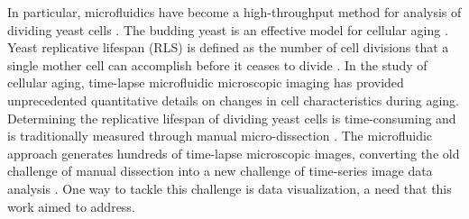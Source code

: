 \documentclass[conference]{IEEEtran}
\begin{document}
In particular, microfluidics have become a high-throughput method for analysis of dividing yeast cells \cite{r13}. The budding yeast is an effective model for cellular aging \cite{r14}. Yeast replicative lifespan (RLS) is defined as the number of cell divisions that a single mother cell can accomplish before it ceases to divide \cite{r15}. 
In the study of cellular aging, time-lapse microfluidic microscopic imaging has provided unprecedented quantitative details on changes in cell characteristics during aging. 
 Determining the replicative lifespan of dividing yeast cells is time-consuming and is traditionally measured through manual micro-dissection \cite{r16,r17}. The microfluidic approach generates hundreds of time-lapse microscopic images, converting the old challenge of manual dissection into a new challenge of time-series image data analysis \cite{r18,r19,r20}. One way to tackle this challenge is data visualization, a need that this work aimed to address. 
%
%
%

%


\end{document}

